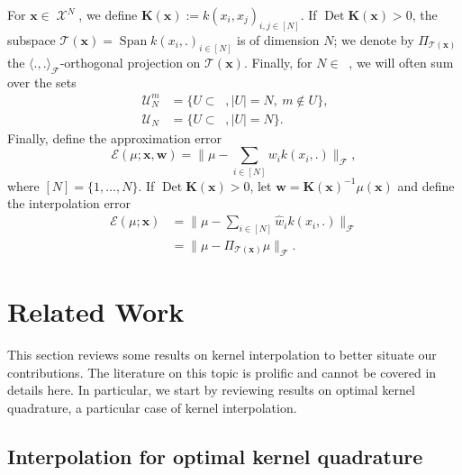 \documentclass[twoside,11pt]{book}
\numberwithin{theorem}{chapter}
\numberwithin{definition}{chapter}
\numberwithin{proposition}{chapter}
\numberwithin{corollary}{chapter}
\numberwithin{example}{chapter}
\numberwithin{lemma}{chapter}
\DeclareMathOperator{\Det}{Det}
\DeclareMathOperator{\Span}{\mathrm{Span}}
\DeclareMathOperator{\F}{\mathcal{F}}
\DeclareMathOperator{\X}{\mathcal{X}}
\DeclareMathOperator{\Ns}{\mathbb{N}^{*}}
\def\UN{\:\mathcal{U}_N}
\def\UNm{\:\mathcal{U}_N^m}
\newcommand{\rb}[1]{\textcolor{magenta}{#1}}
\begin{document}
For $\bm{x} \in \X^{N}$, we define $\bm{K}(\bm{x}) := k(x_{i},x_{j})_{i,j \in [N]}$. If $\Det \bm{K}(\bm{x})>0$,  the subspace $\mathcal{T}(\bm{x}) = \Span k(x_{i},.)_{i \in [N]}$ is of dimension $N$; we denote by $\Pi_{\mathcal{T}(\bm{x})}$ the $\langle.,. \rangle_{\F}$-orthogonal projection on $\mathcal{T}(\bm{x})$.
Finally, for $N \in \Ns$, we will often sum over the sets
\begin{align}
	\UNm &=  \{ U \subset \Ns, |U| = N,\: m \notin U \},\\
  \UN &=  \{ U \subset \Ns, |U| = N \}.
\end{align}
Finally, define the approximation error
\begin{equation}\label{CVS_def:E}
	\mathcal{E}(\mu;\bm{x},\bm{w}) = \|\mu - \sum\limits_{i \in [N]} w_{i} k(x_{i},.)\|_{\F},
\end{equation}
where $[N]=\{1,\dots,N\}$. If $\Det \bm{K}(\bm{x}) >0$, let $\hat{\bm{w}} = \bm{K}(\bm{x})^{-1} \mu(\bm{x})$ and define the interpolation error
\begin{align}\label{CVS_def:Ei}
	\mathcal{E}(\mu;\bm{x}) &= \|\mu - \sum\limits_{i \in [N]} \hat{w} _{i} k(x_{i},.)\|_{\F}\\
  & = \|\mu - \Pi_{\mathcal{T}(\bm{x})} \mu\|_{\F}.
\end{align}


\section{Related Work}\label{CVS_s:relatedWork}
This section reviews some results on kernel interpolation to better situate our contributions. The literature on this topic is prolific and cannot be covered in details here. In particular, we start by reviewing results on optimal kernel quadrature, a particular case of kernel interpolation.

\subsection{Interpolation for optimal kernel quadrature}\label{CVS_sec:review_optimal_kernel_quadrature}
\end{document}
